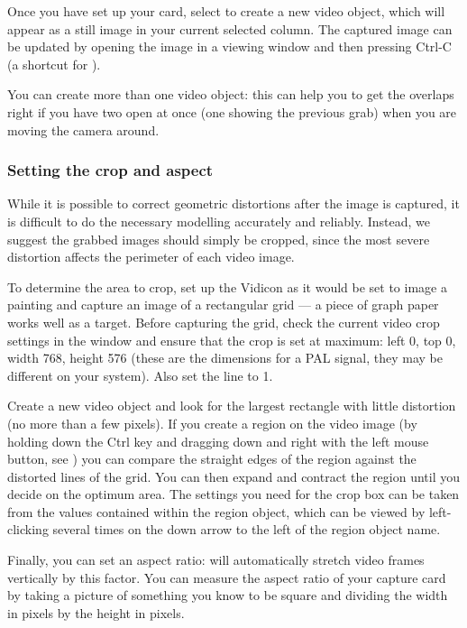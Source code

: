 Once you have set up your card, select  to create a new video object, which will appear as a still
image in your current selected column.  The captured image can be updated by
opening the image in a viewing window and then pressing Ctrl-C (a shortcut
for ).

You can create more than one video object: this can help you to get the
overlaps right if you have two open at once (one showing the previous grab)
when you are moving the camera around.

\subsubsection{Setting the crop and aspect}

While it is possible to correct geometric distortions after the image is
captured, it is difficult to do the necessary modelling accurately and
reliably. Instead, we suggest the grabbed images should simply be cropped,
since the most severe distortion affects the perimeter of each video image.

To determine the area to crop, set up the Vidicon as it would be set to
image a painting and capture an image of a rectangular grid --- a piece of
graph paper works well as a target.  Before capturing the grid, check the
current video crop settings in the  window
and ensure that the crop is set at maximum: left 0, top 0, width 768,
height 576 (these are the dimensions for a PAL signal, they may be different
on your system). Also set the  line to 1.

Create a new video object and look for the largest rectangle with little
distortion (no more than a few pixels). If you create a region on the video
image (by holding down the Ctrl key and dragging down and right with
the left mouse button, see ) you can compare the straight
edges of the region against the distorted lines of the grid. You can then
expand and contract the region until you decide on the optimum area. The
settings you need for the crop box can be taken from the values contained
within the region object, which can be viewed by left-clicking several
times on the down arrow to the left of the region object name.

Finally, you can set an aspect ratio: \nip{} will automatically stretch
video frames vertically by this factor. You can measure the aspect ratio of
your capture card by taking a picture of something you know to be square and
dividing the width in pixels by the height in pixels.

